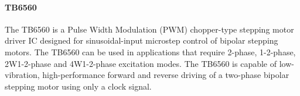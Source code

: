 \paragraph{TB6560}
The TB6560 is a Pulse Width Modulation (PWM) chopper-type stepping motor driver IC designed for sinusoidal-input microstep control of bipolar stepping motors.
The TB6560 can be used in applications that require 2-phase, 1-2-phase, 2W1-2-phase and 4W1-2-phase excitation modes.
The TB6560 is capable of low-vibration, high-performance forward and reverse driving of a two-phase bipolar stepping motor using only a clock signal.